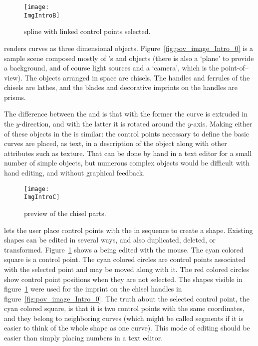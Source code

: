 \begin{figure}[htb]
\centering
\texttt{[image: \\ImgIntroB]}
\caption{\dtybeznu{} spline with linked control points selected.}
\label{fig:bezier_linked_control_points}
\end{figure}

\IXpov{} renders \IXspline{} curves as three dimensional objects.
Figure~\ref{fig:pov_image_Intro_0} is a sample scene
composed mostly of \IXpov's \IXprism{} and \IXlathe{} objects
(there is also a `plane' to provide a background, and of course
light sources and a `camera', which is the point-of--view).
The objects arranged in space
are chisels. The handles and ferrules of the chisels are
\IXpov{} lathes, and the blades and decorative imprints
on the handles are prisms.

The difference between the \IXprism{} and \IXlathe{} is that
with the former the curve is extruded in the $y$-direction,
and with the latter it is rotated around the $y$-axis.
Making either of these objects in the \IXpov{} 
is similar: the control points necessary to define the
basic curves are placed, as text, in a description of
the object along with other attributes such as texture.
That can be done by hand in a text editor for a small
number of simple objects, but numerous complex objects
would be difficult with hand editing, and
without graphical feedback.

\begin{figure}[htb]
\centering
\texttt{[image: \\ImgIntroC]}
\caption{\dtypov{} preview of the chisel parts.}
\label{fig:chisel_edit_preview_1}
\end{figure}

\IXpkgu{} lets the user place control points with the
 in sequence to create a shape.
Existing shapes can be edited in several ways, and also
duplicated, deleted, or transformed.
Figure~\ref{fig:bezier_linked_control_points}
shows a \IXarg{\dtybezil} \IXspline{} being edited with the mouse.
The cyan colored square is a  control
point. The cyan colored circles are control points
associated with the selected point and may be moved along with
it. The red colored circles show control point
positions when they are not selected. The shapes visible
in figure~\ref{fig:bezier_linked_control_points} were
used for the imprint on the chisel handles in
figure~\ref{fig:pov_image_Intro_0}. The truth about
the selected control point, the cyan colored square, is
that it is two control points with the same coordinates,
and they belong to neighboring curves (which might be
called segments if it is easier to think of the whole
shape as one curve). This mode of editing should be easier
than simply placing numbers in a text editor.

